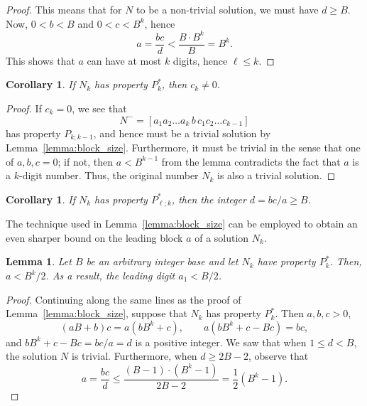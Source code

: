 \documentclass[sn-mathphys]{sn-jnl}%
\theoremstyle{thmstyleone}%
\newtheorem{lemma}[theorem]{Lemma}
\newtheorem{corollary}[theorem]{Corollary}
\theoremstyle{thmstyletwo}%
\theoremstyle{thmstylethree}%
\begin{document}
\begin{appendices}
\begin{proof}
    This means that for $N$ to be a non-trivial solution, we must have $d \geq B$. Now, 
    $0 < b < B$ and $0 < c < B^k$, hence \[
        a = \frac{bc}{d} < \frac{B \cdot B^k}{B} = B^k.
    \] This shows that $a$ can have at most $k$ digits, hence $\ell \leq k$.
\end{proof}

\begin{corollary} \label{corollary:last_digit}
    If $N_k$ has property $P^*_k$, then $c_k \neq 0$.
\end{corollary}
\begin{proof}
    If $c_k = 0$, we see that \[
        N^- = [a_1a_2\dots a_k \,b\, c_1c_2\dots c_{k - 1}]
    \] has property $P_{k; k - 1}$, and hence must be a trivial solution by
    Lemma~\ref{lemma:block_size}. Furthermore, it must be trivial in the sense
    that one of $a, b, c = 0$; if not, then $a < B^{k - 1}$ from the
    lemma contradicts the fact that $a$ is a $k$-digit number.
    Thus, the original number $N_k$ is also a trivial solution.
\end{proof}

\begin{corollary} \label{corollary:trivial_ratio}
    If $N_k$ has property $P^*_{\ell; k}$, then the integer $d = bc / a \geq B$.
\end{corollary}

The technique used in Lemma~\ref{lemma:block_size} can be employed to obtain
an even sharper bound on the leading block $a$ of a solution $N_k$.

\begin{lemma} \label{lemma:leading_digit}
    Let $B$ be an arbitrary integer base and let $N_k$ have property
    $P^*_k$.
    Then, $a < B^k / 2$. As a result, the leading digit $a_1 < B / 2$.
\end{lemma}
\begin{proof}
    Continuing along the same lines as the proof of Lemma~\ref{lemma:block_size}, 
    suppose that $N_k$ has property $P^*_k$. Then $a, b, c > 0$, \[
        (aB + b)c = a(bB^k + c), \qquad
        a(bB^k + c - Bc) = bc,
    \] and $bB^k + c - Bc = bc / a = d$ is a positive integer. We saw 
    that when $1 \leq d < B$, the solution $N$ is trivial. Furthermore, when 
    $d \geq 2B - 2$, observe that \[
        a = \frac{bc}{d} \leq \frac{(B - 1)\cdot (B^k - 1)}{2B - 2} = \frac{1}{2} (B^k - 1).
    \]


\end{proof}
\end{appendices}
\end{document}
